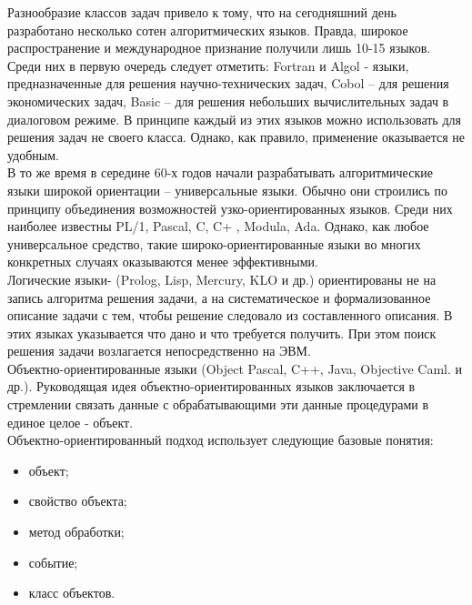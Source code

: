 Разнообразие классов задач привело к тому, что на сегодняшний день разработано несколько сотен алгоритмических языков. Правда, широкое распространение и международное признание получили лишь 10-15 языков. Среди них в первую очередь следует отметить: Fortran и Algol - языки, предназначенные для решения научно-технических задач, Cobol – для решения экономических задач, Basic – для решения небольших вычислительных задач в диалоговом режиме. В принципе каждый из этих языков можно использовать для решения задач не своего класса. Однако, как правило, применение оказывается не удобным. \\

В то же время в середине 60-х годов начали разрабатывать алгоритмические языки широкой ориентации – универсальные языки. Обычно они строились по принципу объединения возможностей узко-ориентированных языков. Среди них наиболее известны PL/1, Pascal, C, C+ , Modula, Ada. Однако, как любое универсальное средство, такие широко-ориентированные языки во многих конкретных случаях оказываются менее эффективными. \\

Логические языки- (Prolog, Lisp, Mercury, KLO и др.) ориентированы не на запись алгоритма решения задачи, а на систематическое и формализованное описание задачи с тем, чтобы решение следовало из составленного описания. В этих языках указывается что дано и что требуется получить. При этом поиск решения задачи возлагается непосредственно на ЭВМ. \\

Объектно-ориентированные языки (Object Pascal, C++, Java, Objective Caml. и др.). Руководящая идея объектно-ориентированных языков заключается в стремлении связать данные с обрабатывающими эти данные процедурами в единое целое - объект. \\

Объектно-ориентированный подход использует следующие базовые понятия: \\

\begin{itemize}
  \item объект;
  \item свойство объекта;
  \item метод обработки;
  \item событие;
  \item класс объектов.
\end{itemize}
\

\

